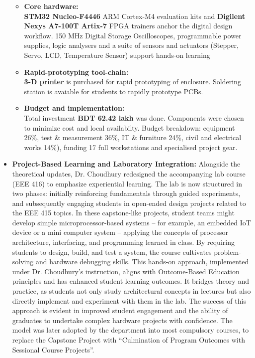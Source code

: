 \documentclass[cvauthor={Dr. Sajid Muhaimin Choudhury}]{buetcv}
\begin{document}
\begin{itemize}
\begin{itemize}
        \item \textbf{Core hardware:} \\ \textbf{STM32 Nucleo-F4446} ARM Cortex-M4 evaluation kits and \textbf{Digilent Nexys A7-100T Artix-7} FPGA trainers anchor the digital design workflow. 150 MHz Digital Storage Oscilloscopes, programmable power supplies, logic analysers and a suite of sensors and actuators (Stepper, Servo, LCD, Temperature Sensor) support hands-on learning 
        \item \textbf{Rapid-prototyping tool-chain:} \\
        \textbf{3-D printer} is purchased for rapid prototyping of enclosure. Soldering station is avaiable for students to rapidly prototype PCBs.    
        \item \textbf{Budget and implementation: } \\
        Total investment \textbf{BDT 62.42 lakh} was done. Components were chosen to minimize cost and local availabilty. Budget breakdown: equipment 26\%, test \& measurement 36\%, IT \& furniture 24\%, civil and electrical works 14\%), funding 17 full workstations and specialised project gear.
    \end{itemize}        
    \item \textbf{Project-Based Learning and Laboratory Integration:} Alongside the theoretical updates, Dr. Choudhury redesigned the accompanying lab course (EEE 416) to emphasize experiential learning. The lab is now structured in two phases: initially reinforcing fundamentals through guided experiments, and subsequently engaging students in open-ended design projects related to the EEE 415 topics. In these capstone-like projects, student teams might develop simple microprocessor-based systems – for example, an embedded IoT device or a mini computer system – applying the concepts of processor architecture, interfacing, and programming learned in class. By requiring students to design, build, and test a system, the course cultivates problem-solving and hardware debugging skills. This hands-on approach, implemented under Dr. Choudhury’s instruction, aligns with Outcome-Based Education principles and has enhanced student learning outcomes. It bridges theory and practice, as students not only study architectural concepts in lectures but also directly implement and experiment with them in the lab. The success of this approach is evident in improved student engagement and the ability of graduates to undertake complex hardware projects with confidence. The model was later adopted by the department into most compulsory courses, to replace the Capstone Project with “Culmination of Program Outcomes with Sessional Course Projects”. 

\end{itemize}
\end{document}
